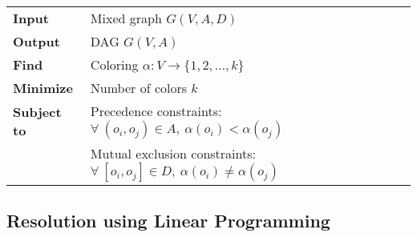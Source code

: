 \begin{table}[H]
\centering
\begin{tabular}{l  l}
  \rule{0pt}{5ex}	
	\textbf{Input} & Mixed graph $G(V,A,D)$\\
	\rule{0pt}{5ex}									  
	
  \textbf{Output} & DAG $G(V,A)$\\
	\rule{0pt}{5ex}									  
  
	\textbf{Find} & Coloring $\alpha: V \rightarrow \{1, 2, \ldots, k\}$\\
	\rule{0pt}{5ex}
	
	\textbf{Minimize} & Number of colors $k$\\
	\rule{0pt}{5ex}									 
	
	\textbf{Subject to} & Precedence constraints: $\forall\ (o_i,o_j) \in A,\ \alpha(o_i) < \alpha(o_j)$\\
											& Mutual exclusion constraints: $\forall\ [o_i,o_j] \in D,\ \alpha(o_i) \neq \alpha(o_j)$
										 
\end{tabular}
\end{table}

%

\subsection{Resolution using Linear Programming}

